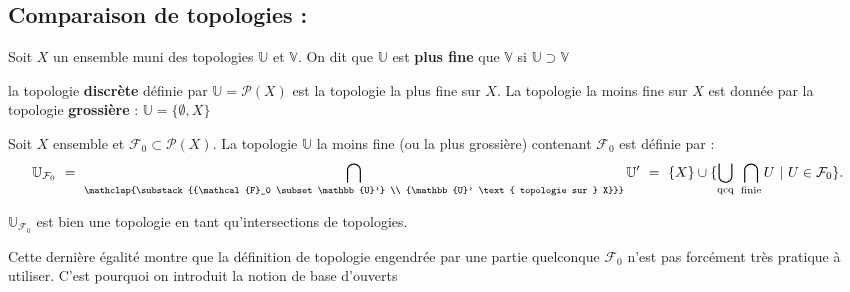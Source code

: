 \subsection{Comparaison de topologies :}
\begin{definition}
    Soit $X$ un ensemble muni des topologies $\mathbb{U}$ et $\mathbb{V}$. On dit que $\mathbb{U}$ est \textbf{plus fine} que $\mathbb{V}$ si $\mathbb{U}\supset\mathbb{V}$
\end{definition}
\begin{ex}
    la topologie \textbf{discrète} définie par $\mathbb{U}=\mathcal{P}(X)$ est la topologie la plus fine sur $X$. La topologie la moins fine sur $X$ est donnée par la topologie \textbf{grossière} : $\mathbb{U}=\{\emptyset, X\}$
\end{ex}

\begin{definition}
     Soit $X$ ensemble et $\mathcal{F}_0\subset \mathcal{P}(X)$. La topologie $\mathbb{U}$ la moins fine (ou la plus grossière) contenant $\mathcal{F}_0$ est définie par :
     $$\mathbb{U}_{\mathcal{F}_0}\ =\ \bigcap_{\mathclap{\substack{{\mathcal{F}_0 \subset \mathbb{U}'} \\ {\mathbb{U}' \text{ topologie sur } X}}}} \mathbb{U}' \ =\  \{X\} \cup \{ \bigcup_{\text{qcq}} \ \bigcap_{\text{finie}} U ~|~ U \in \mathcal{F}_0\}.$$
     
$\mathbb{U}_{\mathcal{F}_0}$ est bien une topologie en tant qu'intersections de topologies.
\end{definition}

Cette dernière égalité montre que la définition de topologie engendrée par une partie quelconque $\mathcal{F}_0$ n'est pas forcément très pratique à utiliser. C'est pourquoi on introduit la notion de base d'ouverts

